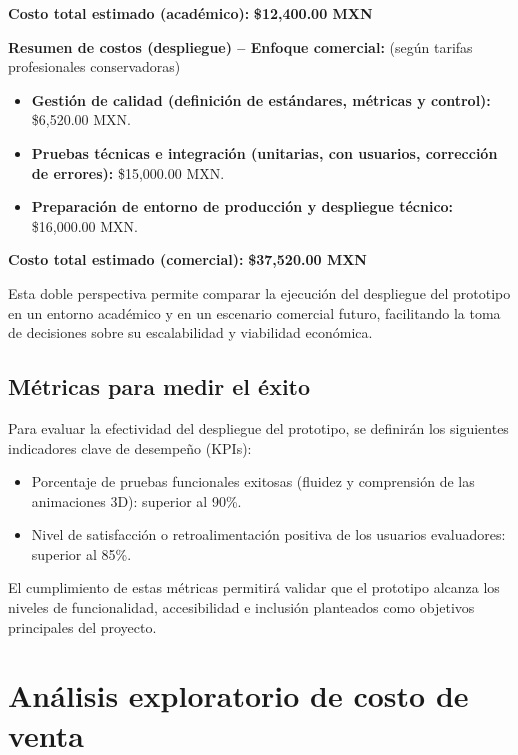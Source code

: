 \noindent\textbf{Costo total estimado (académico):} \textbf{\$12,400.00 MXN}

\vspace{1em}
\noindent\textbf{Resumen de costos (despliegue) – Enfoque comercial:} (según tarifas profesionales conservadoras)

\begin{itemize}
	\item \textbf{Gestión de calidad (definición de estándares, métricas y control):} \$6,520.00 MXN.
	\item \textbf{Pruebas técnicas e integración (unitarias, con usuarios, corrección de errores):} \$15,000.00 MXN.
	\item \textbf{Preparación de entorno de producción y despliegue técnico:} \$16,000.00 MXN.
\end{itemize}

\noindent\textbf{Costo total estimado (comercial):} \textbf{\$37,520.00 MXN}

\vspace{1em}
Esta doble perspectiva permite comparar la ejecución del despliegue del prototipo en un entorno académico y en un escenario comercial futuro, facilitando la toma de decisiones sobre su escalabilidad y viabilidad económica.


\subsection{Métricas para medir el éxito}

Para evaluar la efectividad del despliegue del prototipo, se definirán los siguientes indicadores clave de desempeño (KPIs):

\begin{itemize}
	\item Porcentaje de pruebas funcionales exitosas (fluidez y comprensión de las animaciones 3D): superior al 90\%.
	\item Nivel de satisfacción o retroalimentación positiva de los usuarios evaluadores: superior al 85\%.
\end{itemize}

El cumplimiento de estas métricas permitirá validar que el prototipo alcanza los niveles de funcionalidad, accesibilidad e inclusión planteados como objetivos principales del proyecto.


\newpage
\section{Análisis exploratorio de costo de venta}


